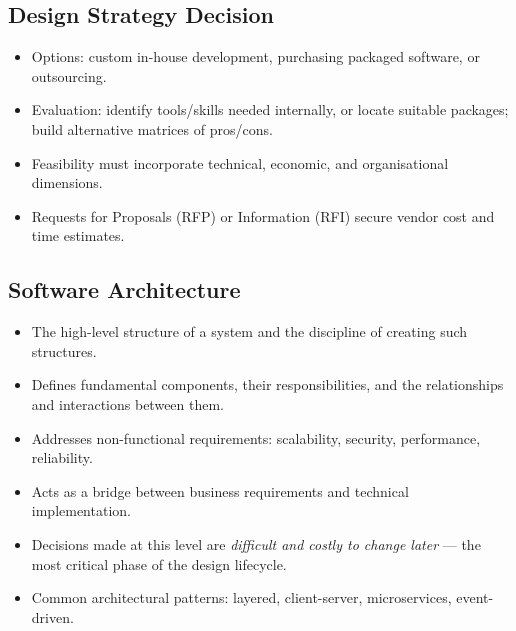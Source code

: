 \documentclass[hidelinks]{article}
\begin{document}
\subsection{Design Strategy Decision}
\begin{itemize}
  \item Options: custom in-house development, purchasing packaged software, or outsourcing.
  \item Evaluation: identify tools/skills needed internally, or locate suitable packages; build
        alternative matrices of pros/cons.
  \item Feasibility must incorporate technical, economic, and organisational dimensions.
  \item Requests for Proposals (RFP) or Information (RFI) secure vendor cost and time estimates.
\end{itemize}

\subsection{Software Architecture}
\begin{itemize}
  \item The high-level structure of a system and the discipline of creating such structures.
  \item Defines fundamental components, their responsibilities, and the relationships and interactions
        between them.
  \item Addresses non-functional requirements: scalability, security, performance, reliability.
  \item Acts as a bridge between business requirements and technical implementation.
  \item Decisions made at this level are \emph{difficult and costly to change later} --- the most
        critical phase of the design lifecycle.
  \item Common architectural patterns: layered, client-server, microservices, event-driven.
\end{itemize}
\end{document}
